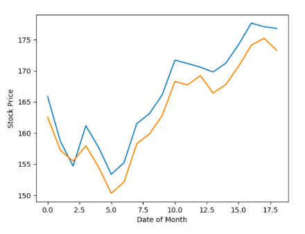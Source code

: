 \documentclass[11pt, oneside]{article}   	%
\begin{document}
\begin{Large}
\begin{figure}[h] %
   \centering
   \includegraphics[width=6in]{prediction_plot} 
\end{figure}


\end{Large}
\end{document}

